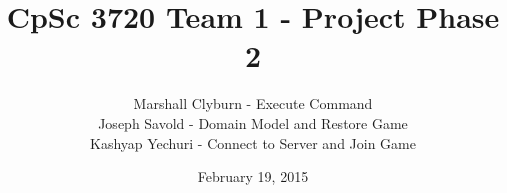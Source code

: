 \documentclass[11pt,openany]{report}
\begin{document}
\title{{\Huge CpSc 3720 Team 1 - Project Phase 2}}
\author{Marshall Clyburn - Execute Command\\
Joseph Savold - Domain Model and Restore Game\\
Kashyap Yechuri - Connect to Server and Join Game}
\date{February 19, 2015}
\maketitle




\end{document}
